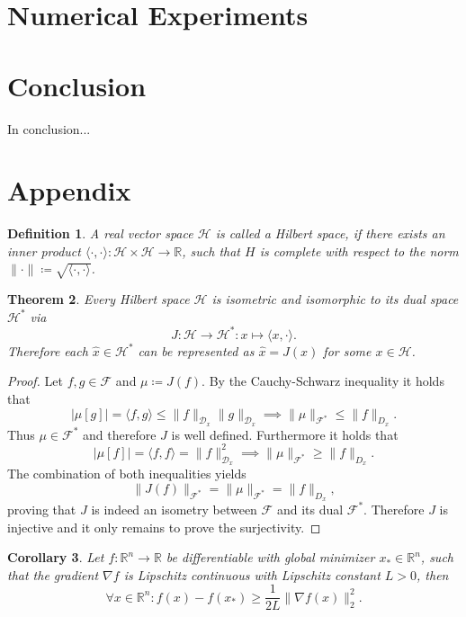 \documentclass[11pt, a4paper]{article}
\newtheorem{theorem}{Theorem}[section]
\newtheorem{corollary}[theorem]{Corollary}
\newtheorem{definition}[theorem]{Definition}
\newcommand{\R}{\mathds{R}}
\newcommand{\D}{\mathcal{D}}
\newcommand{\F}{\mathcal{F}}
\renewcommand{\H}{\mathcal{H}}
\begin{document}
\pagebreak
\section{Numerical Experiments}

\pagebreak
\section{Conclusion}

In conclusion...

\pagebreak
\section{Appendix}

\begin{definition}
A real vector space $\H$ is called a Hilbert space, if there exists an inner product $\langle \cdot,\cdot \rangle : \H \times \H \to \R$, such that $H$ is complete with respect to the norm $\| \cdot \| \coloneq \sqrt{\langle \cdot,\cdot \rangle}$.
\end{definition}

\begin{theorem}
Every Hilbert space $\H$ is isometric and isomorphic to its dual space $\H^*$ via
\[ J: \H \to \H^* : x \mapsto \langle x, \cdot \rangle. \]
Therefore each $\hat{x} \in \H^*$ can be represented as $\hat{x} = J(x)$ for some $x \in \H$.
\end{theorem}

\begin{proof}
Let $f, g \in \F$ and $\mu \coloneq J(f)$. By the Cauchy-Schwarz inequality it holds that
\[ \big | \mu[g] \big | = \langle f,g \rangle \leq \big \| f \big \|_{\D_x} \big \| g \big \|_{\D_x} \implies \big \| \mu \big \|_{\F^*} \le \big \| f \big \|_{D_x}. \]
Thus $\mu \in \F^*$ and therefore $J$ is well defined. Furthermore it holds that 
\[ \big | \mu[f] \big | = \langle f,f \rangle = \big \| f \big \|_{\D_x}^2 \implies \big \| \mu \big \|_{\F^*} \ge \big \| f \big \|_{D_x}. \]
The combination of both inequalities yields
\[ \big \| J(f) \big \|_{\F^*} = \big \| \mu \big \|_{\F^*} = \big \| f \big \|_{D_x}, \]
proving that $J$ is indeed an isometry between $\F$ and its dual $\F^*$. Therefore $J$ is injective and it only remains to prove the surjectivity.
\end{proof}

\begin{corollary} \label{cor:descent}
Let $f: \R^n \to \R$ be differentiable with global minimizer $x_* \in \R^n$, such that the gradient $\nabla f$ is Lipschitz continuous with Lipschitz constant $L >0$, then
\[ \forall x \in \R^n : f(x) - f(x_*) \geq \frac{1}{2L} \big \| \nabla f(x) \big \|_2^2. \]
\end{corollary}
\end{document}
